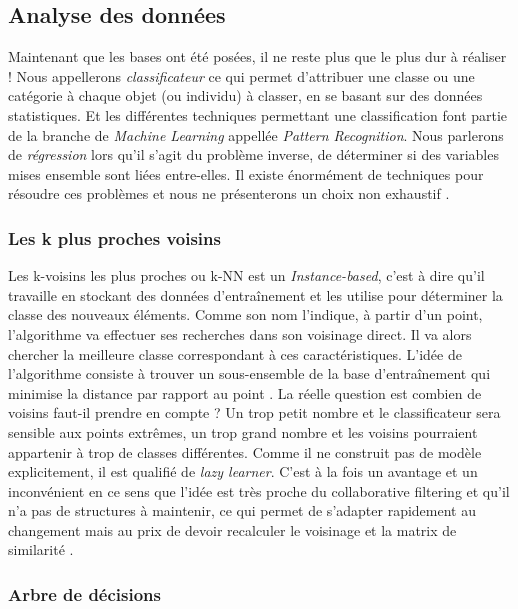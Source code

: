 \subsection{Analyse des données}

Maintenant que les bases ont été posées, il ne reste plus que le plus dur à réaliser ! Nous appellerons \textit{classificateur} ce qui permet d'attribuer une classe ou une catégorie à chaque objet (ou individu) à classer, en se basant sur des données statistiques. Et les différentes techniques permettant une classification font partie de la branche de \textit{Machine Learning} appellée \textit{Pattern Recognition}. Nous parlerons de \textit{régression} lors qu'il s'agit du problème inverse, de déterminer si des variables mises ensemble sont liées entre-elles. Il existe énormément de techniques pour résoudre ces problèmes et nous ne présenterons un choix non exhaustif \cite{jain2000statistical}.

\subsubsection{Les k plus proches voisins} \label{subsubsection:(k)-Nearest Neighbours}

Les k-voisins les plus proches ou k-NN est un \textit{Instance-based}, c'est à dire qu'il travaille en stockant des données d'entraînement et les utilise pour déterminer la classe des nouveaux éléments. Comme son nom l'indique, à partir d'un point, l'algorithme va effectuer ses recherches dans son voisinage direct. Il va alors chercher la meilleure classe correspondant à ces caractéristiques. L'idée de l'algorithme consiste à trouver un sous-ensemble de la base d'entraînement qui minimise la distance par rapport au point \cite{CoverHart1967}. La réelle question est combien de voisins faut-il prendre en compte ? Un trop petit nombre et le classificateur sera sensible aux points extrêmes, un trop grand nombre et les voisins pourraient appartenir à trop de classes différentes. Comme il ne construit pas de modèle explicitement, il est qualifié de \textit{lazy learner}. C'est à la fois un avantage et un inconvénient en ce sens que l'idée est très proche du collaborative filtering et qu'il n'a pas de structures à maintenir, ce qui permet de s'adapter rapidement au changement mais au prix de devoir recalculer le voisinage et la matrix de similarité \cite{wilson1972asymptotic}.

\subsubsection{Arbre de décisions}

